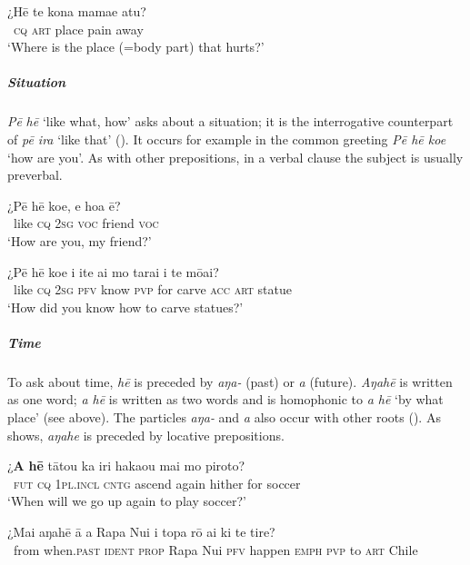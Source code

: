 \ea\label{ex:10.60}
\gll ¿Hē te kona mamae atu?\\
~\textsc{cq} \textsc{art} place pain away\\

\glt 
‘Where is the place (=body part) that hurts?’ \textstyleExampleref{[R481.100]} 
\z

\subparagraph{Situation} \textit{Pē} \textit{hē} ‘like what, how’ asks about a situation; it is the interrogative counterpart of \textit{pē ira} ‘like that’ (). It occurs for example in the common greeting \textit{Pē hē koe} ‘how are you’. As with other prepositions, in a verbal clause the subject is usually preverbal. 

\ea\label{ex:10.61}
\gll ¿Pē hē koe, e hoa ē? \\
~like \textsc{cq} \textsc{2sg} \textsc{voc} friend \textsc{voc} \\

\glt 
‘How are you, my friend?’ \textstyleExampleref{[R237.116]} 
\z

\ea\label{ex:10.62}
\gll ¿Pē hē koe i {\ꞌ}ite ai mo tarai i te mōai? \\
~like \textsc{cq} \textsc{2sg} \textsc{pfv} know \textsc{pvp} for carve \textsc{acc} \textsc{art} statue \\

\glt 
‘How did you know how to carve statues?’ \textstyleExampleref{[R647.063]} 
\z

\subparagraph{Time} To ask about time, \textit{hē} is preceded by \textit{{\ꞌ}aŋa-} (past) or \textit{a} (future). \textit{{\ꞌ}Aŋahē} is written as one word; \textit{a hē} is written as two words and is homophonic to \textit{a hē} ‘by what place’ (see  above). The particles \textit{{\ꞌ}aŋa-} and \textit{a} also occur with other roots (). As  shows, \textit{{\ꞌ}aŋahe} is preceded by locative prepositions.

\ea\label{ex:10.63}
\gll ¿\textbf{A} \textbf{hē} tātou ka iri haka{\ꞌ}ou mai mo piroto? \\
~\textsc{fut} \textsc{cq} \textsc{1pl.incl} \textsc{cntg} ascend again hither for soccer \\

\glt 
‘When will we go up again to play soccer?’ \textstyleExampleref{[R155.007]} 
\z

\ea\label{ex:10.64}
\gll ¿Mai {\ꞌ}aŋahē {\ꞌ}ā a Rapa Nui i topa rō ai ki te tire? \\
~from when.\textsc{past} \textsc{ident} \textsc{prop} Rapa Nui \textsc{pfv} happen \textsc{emph} \textsc{pvp} to \textsc{art} Chile \\


